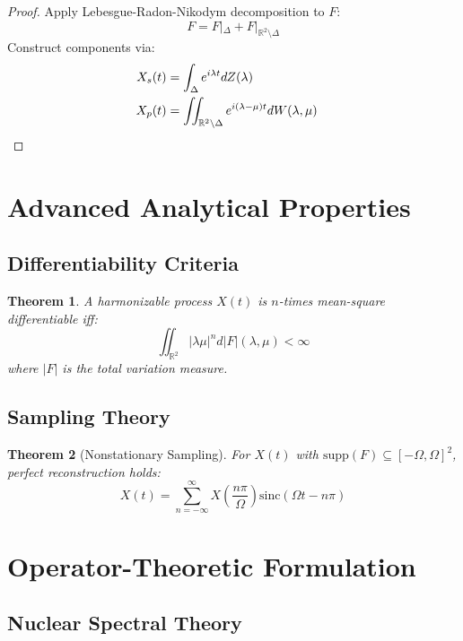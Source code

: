\documentclass[12pt]{article}
\newtheorem{theorem}{Theorem}[section]
\begin{document}
\begin{proof}
Apply Lebesgue-Radon-Nikodym decomposition to $F$:
\begin{equation*}
F = F|_\Delta + F|_{\mathbb{R}^2\setminus\Delta}
\end{equation*}
Construct components via:
\begin{align*}
X_s(t) &= \int_\Delta e^{i\lambda t} dZ(\lambda) \\
X_p(t) &= \iint_{\mathbb{R}^2\setminus\Delta} e^{i(\lambda - \mu)t} dW(\lambda,\mu) \quad \qedhere
\end{align*}
\end{proof}

\section{Advanced Analytical Properties}

\subsection{Differentiability Criteria}

\begin{theorem}
A harmonizable process $X(t)$ is $n$-times mean-square differentiable iff:
\begin{equation}
\iint_{\mathbb{R}^2} |\lambda\mu|^n d|F|(\lambda,\mu) < \infty
\end{equation}
where $|F|$ is the total variation measure.
\end{theorem}

\subsection{Sampling Theory}

\begin{theorem}[Nonstationary Sampling]
For $X(t)$ with $\text{supp}(F) \subseteq [-\Omega,\Omega]^2$, perfect reconstruction holds:
\begin{equation}
X(t) = \sum_{n=-\infty}^\infty X\left(\frac{n\pi}{\Omega}\right) \text{sinc}\left(\Omega t - n\pi\right)
\end{equation}
\end{theorem}

\section{Operator-Theoretic Formulation}

\subsection{Nuclear Spectral Theory}
\end{document}
